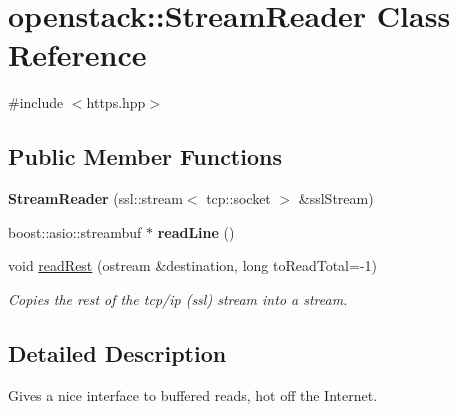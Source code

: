 \hypertarget{classopenstack_1_1StreamReader}{
\section{openstack::StreamReader Class Reference}
\label{classopenstack_1_1StreamReader}
}


{\ttfamily \#include $<$https.hpp$>$}

\subsection*{Public Member Functions}
\begin{DoxyCompactItemize}
\item 
\hypertarget{classopenstack_1_1StreamReader_ac546a8ab7e9c0658e53d620a4aa5967c}{
{\bfseries StreamReader} (ssl::stream$<$ tcp::socket $>$ \&sslStream)}
\label{classopenstack_1_1StreamReader_ac546a8ab7e9c0658e53d620a4aa5967c}

\item 
\hypertarget{classopenstack_1_1StreamReader_ab9a474d176cf53705d9c47c3ebfcf466}{
boost::asio::streambuf $\ast$ {\bfseries readLine} ()}
\label{classopenstack_1_1StreamReader_ab9a474d176cf53705d9c47c3ebfcf466}

\item 
void \hyperlink{classopenstack_1_1StreamReader_a5e389b311a34fb1efacdcb1b3590404e}{readRest} (ostream \&destination, long toReadTotal=-\/1)
\begin{DoxyCompactList}\small\item\em Copies the rest of the tcp/ip (ssl) stream into a stream. \item\end{DoxyCompactList}\end{DoxyCompactItemize}


\subsection{Detailed Description}
Gives a nice interface to buffered reads, hot off the Internet. 

